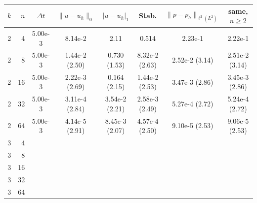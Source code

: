 \begin{tabular}{rrcccccc}
\toprule
$k$ & $n$ & $\Delta t$ & $\|u-u_h\|_0$ & $|u-u_h|_1$ & Stab. & $\|p-p_h\|_{\ell^2(L^2)}$ & same, $n\ge2$ \\
\midrule
2 & 4 & 5.00e-3 & 8.14e-2 & 2.11 & 0.514 & 2.23e-1 & 2.22e-1 \\
2 & 8 & 5.00e-3 & 1.44e-2 (2.50) & 0.730 (1.53) & 8.32e-2 (2.63) & 2.52e-2 (3.14) & 2.51e-2 (3.14) \\
2 & 16 & 5.00e-3 & 2.22e-3 (2.69) & 0.164 (2.15) & 1.44e-2 (2.53) & 3.47e-3 (2.86) & 3.45e-3 (2.86) \\
2 & 32 & 5.00e-3 & 3.11e-4 (2.84) & 3.54e-2 (2.21) & 2.58e-3 (2.49) & 5.27e-4 (2.72) & 5.24e-4 (2.72) \\
2 & 64 & 5.00e-3 & 4.14e-5 (2.91) & 8.45e-3 (2.07) & 4.57e-4 (2.50) & 9.10e-5 (2.53) & 9.06e-5 (2.53) \\
\midrule
3 & 4 & \torun{--} & \torun{--} & \torun{--} & \torun{--} & \torun{--} & \torun{--} \\
3 & 8 & \torun{--} & \torun{--} & \torun{--} & \torun{--} & \torun{--} & \torun{--} \\
3 & 16 & \torun{--} & \torun{--} & \torun{--} & \torun{--} & \torun{--} & \torun{--} \\
3 & 32 & \torun{--} & \torun{--} & \torun{--} & \torun{--} & \torun{--} & \torun{--} \\
3 & 64 & \torun{--} & \torun{--} & \torun{--} & \torun{--} & \torun{--} & \torun{--} \\
\bottomrule
\end{tabular}
